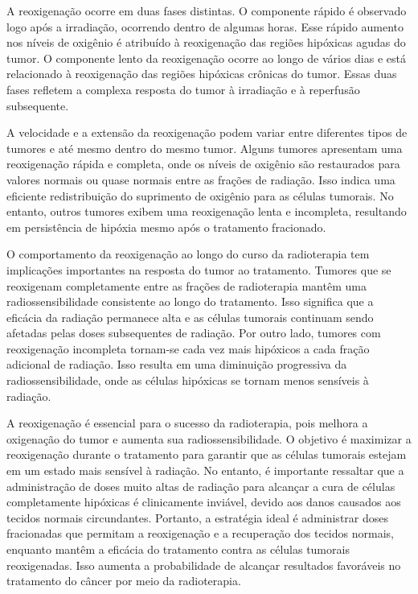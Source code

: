 \documentclass[11pt,a4paper]{article}
\begin{document}
	A reoxigenação ocorre em duas fases distintas. O componente rápido é observado logo após a irradiação, ocorrendo dentro de algumas horas. Esse rápido aumento nos níveis de oxigênio é atribuído à reoxigenação das regiões hipóxicas agudas do tumor. O componente lento da reoxigenação ocorre ao longo de vários dias e está relacionado à reoxigenação das regiões hipóxicas crônicas do tumor. Essas duas fases refletem a complexa resposta do tumor à irradiação e à reperfusão subsequente.

	A velocidade e a extensão da reoxigenação podem variar entre diferentes tipos de tumores e até mesmo dentro do mesmo tumor. Alguns tumores apresentam uma reoxigenação rápida e completa, onde os níveis de oxigênio são restaurados para valores normais ou quase normais entre as frações de radiação. Isso indica uma eficiente redistribuição do suprimento de oxigênio para as células tumorais. No entanto, outros tumores exibem uma reoxigenação lenta e incompleta, resultando em persistência de hipóxia mesmo após o tratamento fracionado.

	O comportamento da reoxigenação ao longo do curso da radioterapia tem implicações importantes na resposta do tumor ao tratamento. Tumores que se reoxigenam completamente entre as frações de radioterapia mantêm uma radiossensibilidade consistente ao longo do tratamento. Isso significa que a eficácia da radiação permanece alta e as células tumorais continuam sendo afetadas pelas doses subsequentes de radiação. Por outro lado, tumores com reoxigenação incompleta tornam-se cada vez mais hipóxicos a cada fração adicional de radiação. Isso resulta em uma diminuição progressiva da radiossensibilidade, onde as células hipóxicas se tornam menos sensíveis à radiação.

	A reoxigenação é essencial para o sucesso da radioterapia, pois melhora a oxigenação do tumor e aumenta sua radiossensibilidade. O objetivo é maximizar a reoxigenação durante o tratamento para garantir que as células tumorais estejam em um estado mais sensível à radiação. No entanto, é importante ressaltar que a administração de doses muito altas de radiação para alcançar a cura de células completamente hipóxicas é clinicamente inviável, devido aos danos causados aos tecidos normais circundantes. Portanto, a estratégia ideal é administrar doses fracionadas que permitam a reoxigenação e a recuperação dos tecidos normais, enquanto mantêm a eficácia do tratamento contra as células tumorais reoxigenadas. Isso aumenta a probabilidade de alcançar resultados favoráveis no tratamento do câncer por meio da radioterapia.
\end{document}
